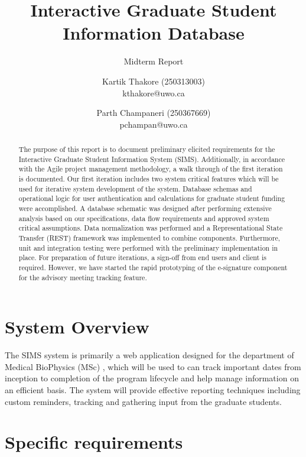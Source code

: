 \documentclass{journal}
\begin{document}

\nocite{*}
\title{Interactive Graduate Student Information Database}
\subtitle{Midterm Report} 
\author{Kartik Thakore (250313003)\\kthakore@uwo.ca \and Parth Champaneri (250367669)\\pchampan@uwo.ca}
\maketitle

\begin{abstract}
The purpose of this report is to document preliminary elicited requirements for the Interactive Graduate Student Information System (SIMS). Additionally, in accordance with the Agile project management methodology, a walk through of the first iteration is documented. Our first iteration includes two system critical features which will be used for iterative system development of the system. Database schemas and operational logic for user authentication and calculations for graduate student funding were accomplished.  A database schematic was designed after performing extensive analysis based on our specifications, data flow requirements and approved system critical assumptions. Data normalization was performed and a Representational State Transfer (REST) framework was implemented to combine components. Furthermore, unit and integration testing were performed with the preliminary implementation in place. For preparation of future iterations, a sign-off from end users and client is required. However, we have started the rapid prototyping of the e-signature component for the advisory meeting tracking feature. 
\end{abstract}

\section{System Overview}
The SIMS system is primarily a web application designed for the department of Medical BioPhysics (MSc) , which will be used to can track important dates from inception to completion of the program lifecycle and help manage information on an efficient basis. The system will provide effective reporting techniques including custom reminders, tracking and gathering input from the graduate students. 

\section{Specific requirements}
\end{document}
